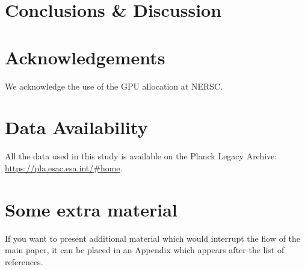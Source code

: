 \documentclass[fleqn,usenatbib]{mnras}
\begin{document}
\section{Conclusions \& Discussion}
\label{sec:conclusions}


\section*{Acknowledgements}

We acknowledge the use of the GPU allocation at NERSC.

\section*{Data Availability}

 
All the data used in this study is available on the Planck Legacy Archive: \url{https://pla.esac.esa.int/#home}.












\appendix

\section{Some extra material}

If you want to present additional material which would interrupt the flow of the main paper,
it can be placed in an Appendix which appears after the list of references.



\bsp	%
\label{lastpage}
\end{document}
